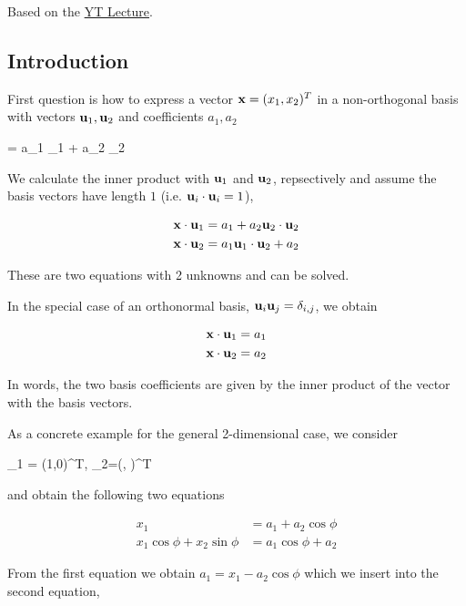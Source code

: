 

Based on the \href{https://www.youtube.com/watch?v=pYoGYQOXqTk&index=14&list=PL.}{YT Lecture}.

\subsection{Introduction}

First question is how to express a vector $\mathbf{x}=(x_1,x_2)^T$ in a non-orthogonal basis with vectors $\mathbf{u}_1, \mathbf{u}_2$ and coefficients $a_1, a_2$

\bee
\xbf = a_1 \ubf_1 + a_2 \ubf_2
\eee

We calculate the inner product with $\mathbf{u}_1$ and $\mathbf{u}_2$, repsectively and assume the basis vectors have length $1$ (i.e. $\mathbf{u}_i \cdot \mathbf{u}_i = 1$),

\begin{align*}
  \mathbf{x} \cdot \mathbf{u}_1 &= a_1 + a_2 \mathbf{u}_2 \cdot \mathbf{u}_2 \\
  \mathbf{x} \cdot \mathbf{u}_2 &= a_1 \mathbf{u}_1 \cdot \mathbf{u}_2 + a_2
\end{align*}

These are two equations with 2 unknowns and can be solved.

In the special case of an orthonormal basis, $\mathbf{u}_i \mathbf{u}_j = \delta_{i,j}$, we obtain

\begin{align*}
  \mathbf{x} \cdot \mathbf{u}_1 &= a_1 \\
  \mathbf{x} \cdot \mathbf{u}_2 &= a_2
\end{align*}

In words, the two basis coefficients are given by the inner product of the vector with the basis vectors.

As a concrete example for the general 2-dimensional case, we consider

\bee
\ubf_1 = (1,0)^T, \quad \ubf_2=(\cos \phi, \sin \phi)^T
\eee

and obtain the following two equations

\begin{align}\label{2018-09-07:eq1}
  x_1 &= a_1 + a_2 \cos \phi \\
  x_1 \cos \phi + x_2 \sin \phi &= a_1 \cos \phi + a_2 \nonumber
\end{align}

From the first equation we obtain $a_1 = x_1 - a_2 \cos \phi$ which we insert into the second equation,

